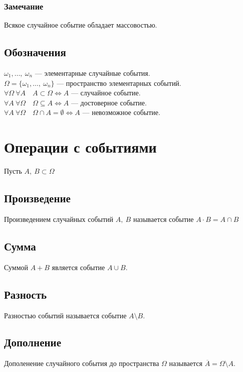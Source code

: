 \documentclass[12pt, a4paper]{article}
\begin{document}
    \subsubsection*{Замечание}
    Всякое случайное событие обладает массовостью.
    \subsection*{Обозначения}
    $\omega_1,\dots,\ \omega_n$ --- элементарные случайные события.\\
    $\Omega = \{\omega_1,\dots,\ \omega_n\}$ --- пространство элементарных событий.\\
    $\forall \Omega\ \forall A\quad A\subset \Omega\Leftrightarrow A$ --- случайное событие.\\
    $\forall A\ \forall \Omega\quad  \Omega\subseteq A\Leftrightarrow A$ --- достоверное событие.\\
    $\forall A\ \forall \Omega\quad \Omega\cap A = \emptyset\Leftrightarrow A$ --- невозможное событие.\\
    \section*{Операции с событиями}
    \begin{center}
        Пусть $A,\ B\subset \Omega$
    \end{center}
    \subsection*{Произведение}
        Произведением случайных событий $A,\ B$ называется событие $A\cdot B = A\cap B$
    \subsection*{Сумма}
        Суммой $A + B$ является событие $A\cup B$.
    \subsection*{Разность}
        Разностью событий называется событие $A\setminus B$.
    \subsection*{Дополнение}
        Дополенение случайного события до пространства $\Omega$ называется $\overline{A} = \Omega\setminus A$.
\end{document}
